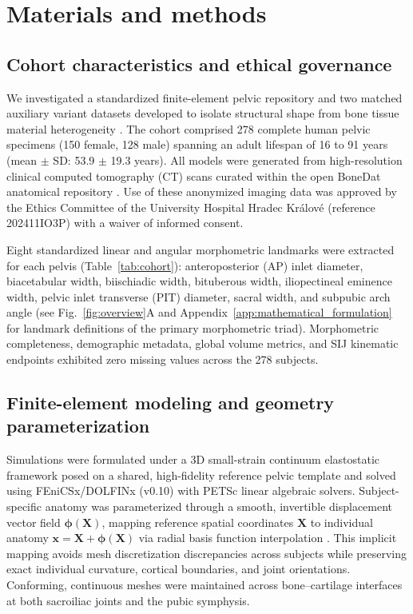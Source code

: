 \section{Materials and methods}
\subsection{Cohort characteristics and ethical governance}
We investigated a standardized finite-element pelvic repository and two matched auxiliary variant datasets developed to isolate structural shape from bone tissue material heterogeneity \citep{HenyssKuchar2025BoneDat}. The cohort comprised 278 complete human pelvic specimens (150 female, 128 male) spanning an adult lifespan of 16 to 91 years (mean $\pm$ SD: 53.9 $\pm$ 19.3 years). All models were generated from high-resolution clinical computed tomography (CT) scans curated within the open BoneDat anatomical repository \citep{HenyssKuchar2025BoneDat}. Use of these anonymized imaging data was approved by the Ethics Committee of the University Hospital Hradec Kr\'alov\'e (reference 202411IO3P) with a waiver of informed consent.

Eight standardized linear and angular morphometric landmarks were extracted for each pelvis (Table~\ref{tab:cohort}): anteroposterior (AP) inlet diameter, biacetabular width, biischiadic width, bituberous width, iliopectineal eminence width, pelvic inlet transverse (PIT) diameter, sacral width, and subpubic arch angle (see Fig.~\ref{fig:overview}A and Appendix~\ref{app:mathematical_formulation} for landmark definitions of the primary morphometric triad). Morphometric completeness, demographic metadata, global volume metrics, and SIJ kinematic endpoints exhibited zero missing values across the 278 subjects.

\begin{table}[H]
\centering
\caption{Cohort demographic and morphometric characteristics stratified by sex. Values represent mean $\pm$ SD.}
\label{tab:cohort}
\end{table}

\subsection{Finite-element modeling and geometry parameterization}
Simulations were formulated under a 3D small-strain continuum elastostatic framework posed on a shared, high-fidelity reference pelvic template \citep{BonetWood1997,MarsdenHughes1983} and solved using FEniCSx/DOLFINx (v0.10) with PETSc linear algebraic solvers. Subject-specific anatomy was parameterized through a smooth, invertible displacement vector field $\boldsymbol{\phi}(\mathbf{X})$, mapping reference spatial coordinates $\mathbf{X}$ to individual anatomy $\mathbf{x} = \mathbf{X} + \boldsymbol{\phi}(\mathbf{X})$ via radial basis function interpolation \citep{HenyssKuchar2025BoneDat}. This implicit mapping avoids mesh discretization discrepancies across subjects while preserving exact individual curvature, cortical boundaries, and joint orientations. Conforming, continuous meshes were maintained across bone--cartilage interfaces at both sacroiliac joints and the pubic symphysis.

